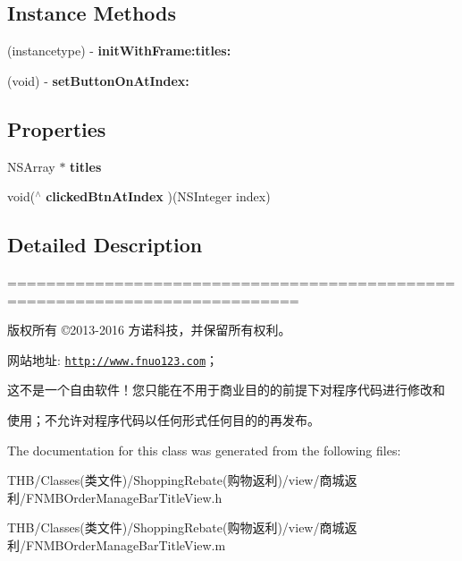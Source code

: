 \subsection*{Instance Methods}
\begin{DoxyCompactItemize}
\item 
\mbox{\label{interface_f_n_m_b_order_manage_bar_title_view_aa14fc6010df90b5906036b3a01cebb59}} 
(instancetype) -\/ {\bfseries init\+With\+Frame\+:titles\+:}
\item 
\mbox{\label{interface_f_n_m_b_order_manage_bar_title_view_a4f9210d570d8c715a82d2bf132dfc9bf}} 
(void) -\/ {\bfseries set\+Button\+On\+At\+Index\+:}
\end{DoxyCompactItemize}
\subsection*{Properties}
\begin{DoxyCompactItemize}
\item 
\mbox{\label{interface_f_n_m_b_order_manage_bar_title_view_a72c295f8cd97195c46a8e08de60db182}} 
N\+S\+Array $\ast$ {\bfseries titles}
\item 
\mbox{\label{interface_f_n_m_b_order_manage_bar_title_view_a0388d3ffe3aeff5288deea6f8e8b1f9f}} 
void($^\wedge$ {\bfseries clicked\+Btn\+At\+Index} )(N\+S\+Integer index)
\end{DoxyCompactItemize}


\subsection{Detailed Description}
============================================================================

版权所有 ©2013-\/2016 方诺科技，并保留所有权利。

网站地址\+: \href{http://www.fnuo123.com}{\tt http\+://www.\+fnuo123.\+com}； 



这不是一个自由软件！您只能在不用于商业目的的前提下对程序代码进行修改和

使用；不允许对程序代码以任何形式任何目的的再发布。 

 

The documentation for this class was generated from the following files\+:\begin{DoxyCompactItemize}
\item 
T\+H\+B/\+Classes(类文件)/\+Shopping\+Rebate(购物返利)/view/商城返利/F\+N\+M\+B\+Order\+Manage\+Bar\+Title\+View.\+h\item 
T\+H\+B/\+Classes(类文件)/\+Shopping\+Rebate(购物返利)/view/商城返利/F\+N\+M\+B\+Order\+Manage\+Bar\+Title\+View.\+m\end{DoxyCompactItemize}
